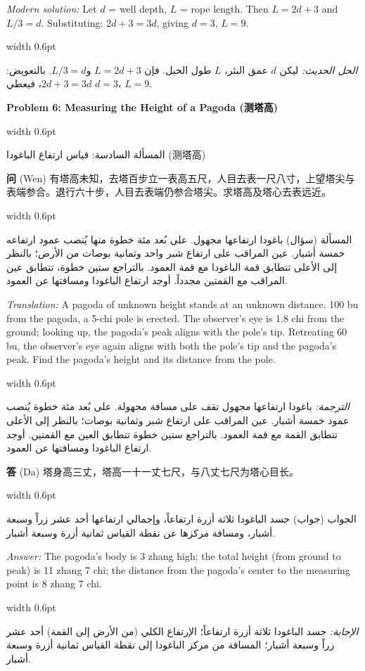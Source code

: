 \documentclass[11pt,a4paper]{article}
\newlength{\cnwidth}
\newlength{\arwidth}
\newcommand{\paralleltext}[2]{%
  \par\medskip\noindent
  \begin{minipage}[t]{\cnwidth}%
    \small #1%
  \end{minipage}%
  \hfill\textcolor{colrule}{\vrule width 0.6pt}\hfill
  \begin{minipage}[t]{\arwidth}%
    \small\arabicfont\beginR #2\endR%
  \end{minipage}%
  \par\medskip
}
\newcommand{\parallelsubsection}[2]{%
  \par\medskip\noindent
  \begin{minipage}[t]{\cnwidth}%
    \large\bfseries\color{sectioncolor} #1%
  \end{minipage}%
  \hfill\textcolor{colrule}{\vrule width 0.6pt}\hfill
  \begin{minipage}[t]{\arwidth}%
    \large\arabicfontbf\color{sectioncolor}\beginR #2\endR%
  \end{minipage}%
  \par\smallskip
}
\newcommand{\cnlabel}[1]{\textbf{\color{notecolor}#1}}
\newcommand{\arlabel}[1]{\arabicfontbf\color{notecolor}\beginR #1\endR}
\begin{document}
\paralleltext{%
\textit{Modern solution:} Let $d$ = well depth, $L$ = rope length. Then $L = 2d + 3$ and $L/3 = d$. Substituting: $2d + 3 = 3d$, giving $d = 3$, $L = 9$.
}{%
\textit{الحل الحديث:} ليكن $d$ عمق البئر، $L$ طول الحبل. فإن $L = 2d + 3$ و$L/3 = d$. بالتعويض: $2d + 3 = 3d$، فيعطي $d = 3$، $L = 9$.
}

\parallelsubsection{Problem 6: Measuring the Height of a Pagoda (测塔高)}{المسألة السادسة: قياس ارتفاع الباغودا (测塔高)}

\paralleltext{%
\cnlabel{问} (Wen) 有塔高未知，去塔百步立一表高五尺，人目去表一尺八寸，上望塔尖与表端参合。退行六十步，人目去表端仍参合塔尖。求塔高及塔心去表远近。
}{%
\arlabel{المسألة} (سؤال) باغودا ارتفاعها مجهول. على بُعد مئة خطوة منها يُنصب عمود ارتفاعه خمسة أشبار. عين المراقب على ارتفاع شبر واحد وثمانية بوصات من الأرض؛ بالنظر إلى الأعلى تتطابق قمة الباغودا مع قمة العمود. بالتراجع ستين خطوة، تتطابق عين المراقب مع القمتين مجدداً. أوجد ارتفاع الباغودا ومسافتها عن العمود.
}

\paralleltext{%
\textit{Translation:} A pagoda of unknown height stands at an unknown distance. 100 bu from the pagoda, a 5-chi pole is erected. The observer's eye is 1.8 chi from the ground; looking up, the pagoda's peak aligns with the pole's tip. Retreating 60 bu, the observer's eye again aligns with both the pole's tip and the pagoda's peak. Find the pagoda's height and its distance from the pole.
}{%
\textit{الترجمة:} باغودا ارتفاعها مجهول تقف على مسافة مجهولة. على بُعد مئة خطوة يُنصب عمود خمسة أشبار. عين المراقب على ارتفاع شبر وثمانية بوصات؛ بالنظر إلى الأعلى تتطابق القمة مع قمة العمود. بالتراجع ستين خطوة تتطابق العين مع القمتين. أوجد ارتفاع الباغودا ومسافتها عن العمود.
}

\paralleltext{%
\cnlabel{答} (Da) 塔身高三丈，塔高一十一丈七尺，与八丈七尺为塔心目长。
}{%
\arlabel{الجواب} (جواب) جسد الباغودا ثلاثة أزرة ارتفاعاً، وإجمالي ارتفاعها أحد عشر زراً وسبعة أشبار، ومسافة مركزها عن نقطة القياس ثمانية أزرة وسبعة أشبار.
}

\paralleltext{%
\textit{Answer:} The pagoda's body is 3 zhang high; the total height (from ground to peak) is 11 zhang 7 chi; the distance from the pagoda's center to the measuring point is 8 zhang 7 chi.
}{%
\textit{الإجابة:} جسد الباغودا ثلاثة أزرة ارتفاعاً؛ الإرتفاع الكلي (من الأرض إلى القمة) أحد عشر زراً وسبعة أشبار؛ المسافة من مركز الباغودا إلى نقطة القياس ثمانية أزرة وسبعة أشبار.
}
\end{document}
